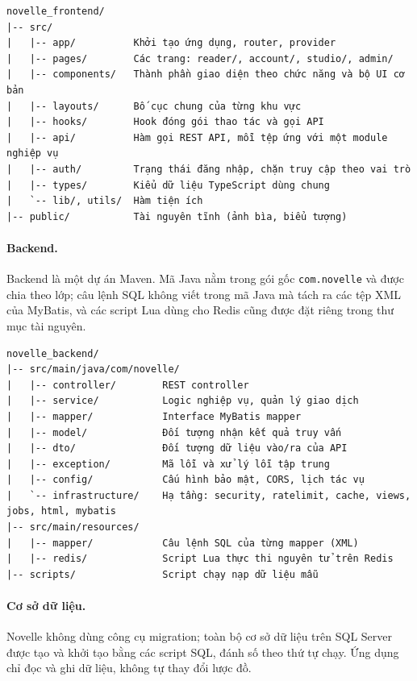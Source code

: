 \begin{verbatim}
novelle_frontend/
|-- src/
|   |-- app/          Khởi tạo ứng dụng, router, provider
|   |-- pages/        Các trang: reader/, account/, studio/, admin/
|   |-- components/   Thành phần giao diện theo chức năng và bộ UI cơ bản
|   |-- layouts/      Bố cục chung của từng khu vực
|   |-- hooks/        Hook đóng gói thao tác và gọi API
|   |-- api/          Hàm gọi REST API, mỗi tệp ứng với một module nghiệp vụ
|   |-- auth/         Trạng thái đăng nhập, chặn truy cập theo vai trò
|   |-- types/        Kiểu dữ liệu TypeScript dùng chung
|   `-- lib/, utils/  Hàm tiện ích
|-- public/           Tài nguyên tĩnh (ảnh bìa, biểu tượng)
\end{verbatim}

\paragraph{Backend.} Backend là một dự án Maven. Mã Java nằm trong gói gốc \texttt{com.novelle} và được chia theo lớp; câu lệnh SQL không viết trong mã Java mà tách ra các tệp XML của MyBatis, và các script Lua dùng cho Redis cũng được đặt riêng trong thư mục tài nguyên.

\begin{verbatim}
novelle_backend/
|-- src/main/java/com/novelle/
|   |-- controller/        REST controller
|   |-- service/           Logic nghiệp vụ, quản lý giao dịch
|   |-- mapper/            Interface MyBatis mapper
|   |-- model/             Đối tượng nhận kết quả truy vấn
|   |-- dto/               Đối tượng dữ liệu vào/ra của API
|   |-- exception/         Mã lỗi và xử lý lỗi tập trung
|   |-- config/            Cấu hình bảo mật, CORS, lịch tác vụ
|   `-- infrastructure/    Hạ tầng: security, ratelimit, cache, views, jobs, html, mybatis
|-- src/main/resources/
|   |-- mapper/            Câu lệnh SQL của từng mapper (XML)
|   |-- redis/             Script Lua thực thi nguyên tử trên Redis
|-- scripts/               Script chạy nạp dữ liệu mẫu
\end{verbatim}

\paragraph{Cơ sở dữ liệu.} Novelle không dùng công cụ migration; toàn bộ cơ sở dữ liệu trên SQL Server được tạo và khởi tạo bằng các script SQL, đánh số theo thứ tự chạy. Ứng dụng chỉ đọc và ghi dữ liệu, không tự thay đổi lược đồ.

